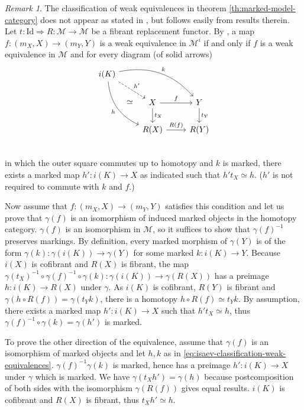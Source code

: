 \documentclass[a4paper]{article}
\theoremstyle{remark}
\newtheorem{remark}[theorem]{Remark}
\theoremstyle{definition}
\begin{document}
\begin{remark}
  The classification of weak equivalences in theorem \ref{th:marked-model-category} does not appear as stated in \cite{marked-objects}, but follows easily from results therein.
  Let $t : \mathrm{Id} \Rightarrow R : \mathcal{M} \rightarrow \mathcal{M}$ be a fibrant replacement functor.
  By \cite[lemma 2.5]{marked-objects}, a map $f : (m_X, X) \rightarrow (m_Y, Y)$ is a weak equivalence in $\mathcal{M}^i$ if and only if $f$ is a weak equivalence in $\mathcal{M}$ and for every diagram (of solid arrows)
  \begin{equation}
    \label{eq:isaev-classification-weak-equivalences}
    \begin{tikzcd}
      i(K) \arrow[drr, bend left, "k"] \arrow[ddr, bend right, "h"'] \arrow[dr, dashed, "h'"] \arrow[ddr, phantom, "\simeq"] \\
      & X \arrow[d, "t_X"] \arrow[r, "f"] & Y \arrow[d, "t_Y"]  \\
      & R(X) \arrow[r, "R(f)"] & R(Y)  \\
    \end{tikzcd}
  \end{equation}
  in which the outer square commutes up to homotopy and $k$ is marked, there exists a marked map $h' : i(K) \rightarrow X$ as indicated such that $h' t_X \simeq h$.
  ($h'$ is not required to commute with $k$ and $f$.)

  Now assume that $f : (m_X, X) \rightarrow (m_Y, Y)$ satisfies this condition and let us prove that $\gamma(f)$ is an isomorphism of induced marked objects in the homotopy category.
  $\gamma(f)$ is an isomorphism in $\mathcal{M}$, so it suffices to show that $\gamma(f)^{-1}$ preserves markings.
  By definition, every marked morphism of $\gamma(Y)$ is of the form $\gamma(k) : \gamma(i(K)) \rightarrow \gamma(Y)$ for some marked $k : i(K) \rightarrow Y$.
  Because $i(X)$ is cofibrant and $R(X)$ is fibrant, the map $\gamma(t_X)^{-1} \circ \gamma(f)^{-1} \circ \gamma(k) : \gamma(i(K)) \rightarrow \gamma(R(X))$ has a preimage $h : i(K) \rightarrow R(X)$ under $\gamma$.
  As $i(K)$ is cofibrant, $R(Y)$ is fibrant and $\gamma(h \circ R(f)) = \gamma(t_Y k)$, there is a homotopy $h \circ R(f) \simeq t_Y k$.
  By assumption, there exists a marked map $h' : i(K) \rightarrow X$ such that $h' t_X \simeq h$, thus $\gamma(f)^{-1} \circ \gamma(k) = \gamma(h')$ is marked.

  To prove the other direction of the equivalence, assume that $\gamma(f)$ is an isomorphism of marked objects and let $h, k$ as in \eqref{eq:isaev-classification-weak-equivalences}.
  $\gamma(f)^{-1} \gamma(k)$ is marked, hence has a preimage $h' : i(K) \rightarrow X$ under $\gamma$ which is marked.
  We have $\gamma(t_X h') = \gamma(h)$ because postcomposition of both sides with the isomorphism $\gamma(R(f))$ gives equal results.
  $i(K)$ is cofibrant and $R(X)$ is fibrant, thus $t_X h' \simeq h$.
\end{remark}
\end{document}
